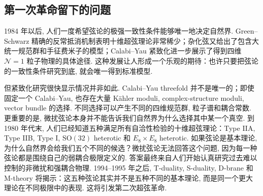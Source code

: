 \documentclass[10pt]{article}
\newcounter{ex}[section]\setcounter{ex}{0}
\numberwithin{equation}{section}
\begin{document}
\subsection{第一次革命留下的问题}

1984 年以后, 人们一度希望弦论的极强一致性条件能够唯一地决定自然界. Green–Schwarz 精确的反常抵消机制表明十维超弦理论非常稀少；杂化弦又给出了包含大统一规范群和手征费米子的模型；Calabi–Yau 紧致化进一步展示了得到四维 $\mathcal N=1$ 粒子物理的具体途径. 这种发展让人形成一个乐观的期待：也许只要把弦论的一致性条件研究到底, 就会唯一得到标准模型. 

但紧致化研究很快显示情况并非如此. Calabi–Yau threefold 并不是唯一的；即使固定一个 Calabi–Yau, 也存在大量 Kähler moduli, complex-structure moduli, vector bundle 的选择. 不同选择可以产生不同的四维规范群, 粒子谱和耦合常数. 更重要的是, 微扰弦论本身并不能告诉我们自然界为什么选择其中某一个真空. 到 1980 年代末, 人们已经知道五种满足所有自洽性检验的十维超弦理论：Type IIA, Type IIB, Type I, $\mathrm{SO}(32)$ heterotic 和 $E_8\times E_8$ heterotic. 如果弦论是基本理论, 为什么自然界会给我们五个不同的候选？微扰弦论无法回答这个问题, 因为每一种弦论都是围绕自己的弱耦合极限定义的. 答案最终来自人们开始认真研究过去难以控制的非微扰和强耦合物理. 1994–1995 年之后, T-duality, S-duality, D-brane 和 M-theory 将揭示：这五种弦论其实并不是五种不同的基本理论, 而是同一个更大理论在不同极限中的表现. 这将引发第二次超弦革命\cite{Witten1995,Polchinski1995}. 








\end{document}
